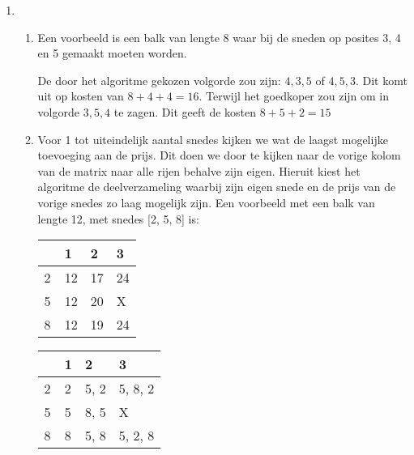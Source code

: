 \documentclass[11pt]{article}
\begin{document}
\begin{enumerate}
    \item
        \begin{enumerate}
            \item
                Een voorbeeld is een balk van lengte 8 waar bij de sneden op
                posites 3, 4 en 5 gemaakt moeten worden.

                De door het algoritme gekozen volgorde zou zijn: $4, 3, 5$ of
                $4, 5, 3$. Dit komt uit op kosten van $8+4+4=16$. Terwijl het
                goedkoper zou zijn om in volgorde $3, 5, 4$ te zagen. Dit geeft
                de kosten $8+5+2=15$

            \item
                Voor 1 tot uiteindelijk aantal snedes kijken we wat de
                laagst mogelijke toevoeging aan de prijs. Dit doen we door te
                kijken naar de vorige kolom van de matrix naar alle rijen
                behalve zijn eigen.
                \pagebreak 
                Hieruit kiest het algoritme de
                deelverzameling waarbij zijn eigen snede en de prijs van de vorige snedes zo laag mogelijk zijn. Een voorbeeld met een
                balk van lengte 12, met snedes [2, 5, 8] is:

                \begin{table}[h]
                \centering
                    \begin{tabular}{l|lll}
                    ~ & 1  & 2  & 3  \\ \hline
                    2 & 12 & 17 & 24 \\
                    5 & 12 & 20 & X  \\
                    8 & 12 & 19 & 24 \\
                    \end{tabular}
                \end{table}
                \begin{table}[h]
                \centering
                    \begin{tabular}{l|lll}
                    ~ & 1 & 2    & 3        \\ \hline
                    2 & 2 & 5, 2 & 5, 8, 2  \\
                    5 & 5 & 8, 5 & X        \\
                    8 & 8 & 5, 8 & 5, 2, 8  \\
                    \end{tabular}
                \end{table}


\end{enumerate}
\end{enumerate}
\end{document}
